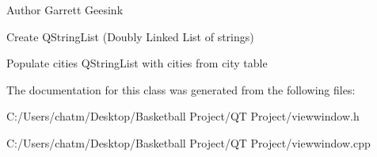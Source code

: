 \begin{DoxyAuthor}{Author}
Garrett Geesink 
\end{DoxyAuthor}
Create Q\+String\+List (Doubly Linked List of strings)

Populate cities Q\+String\+List with cities from city table 

The documentation for this class was generated from the following files\+:\begin{DoxyCompactItemize}
\item 
C\+:/\+Users/chatm/\+Desktop/\+Basketball Project/\+Q\+T Project/viewwindow.\+h\item 
C\+:/\+Users/chatm/\+Desktop/\+Basketball Project/\+Q\+T Project/viewwindow.\+cpp\end{DoxyCompactItemize}
